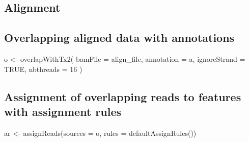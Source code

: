 \documentclass[12pt,twoside]{reedthesis}
\newenvironment{Shaded}{\begin{snugshade}}{\end{snugshade}}
\newcommand{\AttributeTok}[1]{\textcolor[rgb]{0.77,0.63,0.00}{#1}}
\newcommand{\ConstantTok}[1]{\textcolor[rgb]{0.00,0.00,0.00}{#1}}
\newcommand{\DecValTok}[1]{\textcolor[rgb]{0.00,0.00,0.81}{#1}}
\newcommand{\FunctionTok}[1]{\textcolor[rgb]{0.00,0.00,0.00}{#1}}
\newcommand{\NormalTok}[1]{#1}
\newcommand{\OtherTok}[1]{\textcolor[rgb]{0.56,0.35,0.01}{#1}}
\newcommand{\SpecialCharTok}[1]{\textcolor[rgb]{0.00,0.00,0.00}{#1}}
\newcommand{\StringTok}[1]{\textcolor[rgb]{0.31,0.60,0.02}{#1}}
\begin{document}
\hypertarget{alignment-1}{%
\subsection*{Alignment}\label{alignment-1}}
\begin{Shaded}
\end{Shaded}
\hypertarget{overlapping-aligned-data-with-annotations}{%
\subsection*{Overlapping aligned data with annotations}\label{overlapping-aligned-data-with-annotations}}
\begin{Shaded}
\begin{Highlighting}[]
\NormalTok{o }\OtherTok{\textless{}{-}} \FunctionTok{overlapWithTx2}\NormalTok{(}
  \AttributeTok{bamFile =}\NormalTok{ align\_file, }\AttributeTok{annotation =}\NormalTok{ a,}
  \AttributeTok{ignoreStrand =} \ConstantTok{TRUE}\NormalTok{, }\AttributeTok{nbthreads =} \DecValTok{16}
\NormalTok{)}
\end{Highlighting}
\end{Shaded}
\hypertarget{assignment-of-overlapping-reads-to-features-with-assignment-rules}{%
\subsection*{Assignment of overlapping reads to features with assignment rules}\label{assignment-of-overlapping-reads-to-features-with-assignment-rules}}
\begin{Shaded}
\begin{Highlighting}[]
\NormalTok{ar }\OtherTok{\textless{}{-}} \FunctionTok{assignReads}\NormalTok{(}\AttributeTok{sources =}\NormalTok{ o, }\AttributeTok{rules =} \FunctionTok{defaultAssignRules}\NormalTok{())}
\end{Highlighting}
\end{Shaded}
\end{document}
